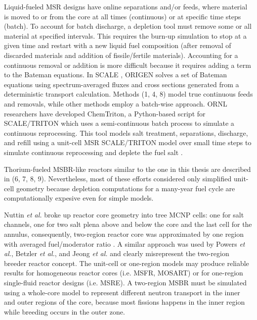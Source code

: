 Liquid-fueled \gls{MSR} designs have online separations and/or feeds, where material is moved to or from the core at all times (continuous) or at specific time steps (batch). To account for batch discharge, a depletion tool must remove some or all material at specified intervals. This requires the burn-up simulation to stop at a given time and restart with a new liquid fuel composition (after removal of discarded materials and addition of fissile/fertile materials). Accounting for a continuous removal or addition is more difficult because it requires adding a term to the Bateman equations. In SCALE \cite{bowman_scale_2011}, ORIGEN \cite{gauld_isotopic_2011} solves a set of Bateman equations using spectrum-averaged fluxes and cross sections generated from a deterministic transport calculation. Methods (1, 4, 8) model true continuous feeds and removals, while other methods employ a batch-wise approach. \gls{ORNL} researchers have developed ChemTriton, a Python-based script for SCALE/TRITON which uses a semi-continuous batch process to simulate a continuous reprocessing. This tool models salt treatment, separations, discharge, and refill using a unit-cell \gls{MSR} SCALE/TRITON model over small time steps to simulate continuous reprocessing and deplete the fuel salt \cite{powers_new_2013}.

Thorium-fueled \gls{MSBR}-like reactors similar to the one in this thesis are described in (6, 7, 8, 9). Nevertheless, most of these efforts considered only simplified unit-cell geometry because depletion computations for a many-year fuel cycle are computationally expesive even for simple models. 

Nuttin \emph{et al.} broke up reactor core geometry into tree \gls{MCNP} cells: one for salt channels, one for two salt plena above and below the core and the last cell for the annulus, consequently, two-region reactor core was approximated by one region with averaged fuel/moderator ratio \cite{nuttin_potential_2005}.  A similar approach was used by Powers \emph{et al.}, Betzler \emph{et al.}, and Jeong \emph{et al.} \cite{powers_new_2013,powers_inventory_2014,betzler_modeling_2016, betzler_molten_2017, jeong_development_2014, jeong_equilibrium_2016} and clearly misrepresent the two-region breeder reactor concept. The unit-cell or one-region models may produce reliable results for homogeneous reactor cores (i.e. \gls{MSFR}, \gls{MOSART}) or for one-region single-fluid reactor designs (i.e. \gls{MSRE}). A two-region \gls{MSBR} must be simulated using a whole-core model to represent different neutron transport in the inner and outer regions of the core, because most fissions happens in the inner region while breeding occurs in the outer zone.  

